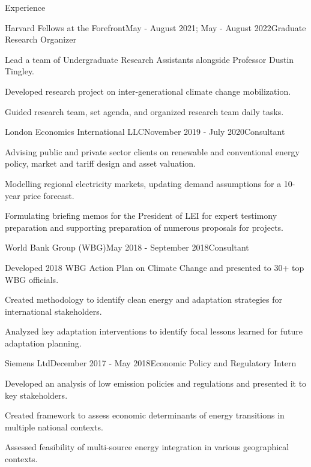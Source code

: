 \documentclass{resume}
\begin{document}
\begin{rSection}{\Large  E\MakeLowercase{xperience}}

\begin{rSubsection}{Harvard Fellows at the Forefront}{May - August 2021; May - August 2022}{Graduate Research Organizer}{}
\item Lead a team of Undergraduate Research Assistants alongside Professor Dustin Tingley. 
\item Developed research project on inter-generational climate change mobilization. 
\item Guided research team, set agenda, and organized research team daily tasks.
\end{rSubsection}

\begin{rSubsection}{London Economics International LLC}{November 2019 - July 2020}{Consultant}{}
\item  Advising public and private sector clients on renewable and conventional energy policy, market and tariff design and asset valuation. 
\item Modelling regional electricity markets, updating demand assumptions for a 10-year price forecast.
\item Formulating briefing memos for the President of LEI for expert testimony preparation and supporting preparation of numerous proposals for projects.
\end{rSubsection}

\begin{rSubsection}{World Bank Group (WBG)}{May 2018 - September 2018}{Consultant}{}
\item Developed 2018 WBG Action Plan on Climate Change and presented to 30+ top WBG officials. 
\item Created methodology to identify clean energy and adaptation strategies for international stakeholders.
\item Analyzed key adaptation interventions to identify focal lessons learned for future adaptation planning.
\end{rSubsection}

\begin{rSubsection}{Siemens Ltd}{December 2017 - May 2018}{Economic Policy and Regulatory Intern}{}
\item Developed an analysis of low emission policies and regulations and presented it to key stakeholders.
\item Created framework to assess economic determinants of energy transitions in multiple national contexts. 
\item Assessed feasibility of multi-source energy integration in various geographical contexts.  
\end{rSubsection}

\end{rSection}
\end{document}
